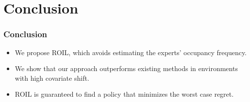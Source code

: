 \documentclass{beamer}
\begin{document}
\section*{Conclusion}

\begin{frame}
	\frametitle{Conclusion}
	\begin{itemize}
		\item We propose ROIL, which avoids estimating the experts' occupancy frequency.
		\item We show that our approach outperforms existing methods in environments with high covariate shift.
		\item ROIL is guaranteed to find a policy that minimizes the worst case regret.
	\end{itemize}
\end{frame}
\end{document}
